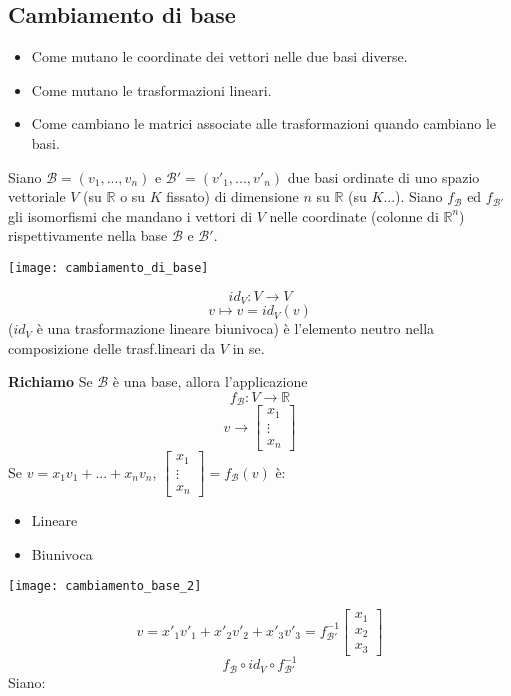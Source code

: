 \subsection{Cambiamento di base}
\begin{itemize}
    \item Come mutano le coordinate dei vettori nelle due basi diverse.
    \item Come mutano le trasformazioni lineari.
    \item Come cambiano le matrici associate alle trasformazioni quando cambiano le basi.
\end{itemize}


Siano $\mathcal{B}=(v_1,...,v_n)$ e $\mathcal{B}'=(v'_1,...,v'_n)$ due basi ordinate di uno spazio vettoriale $V$ (su $\mathbb{R}$ o su $K$ fissato) di dimensione $n$ su $\mathbb{R}$ (su $K$...).
Siano $f_{\mathcal{B}}$ ed $f_{\mathcal{B}'}$ gli isomorfismi che mandano i vettori di $V$ nelle coordinate (colonne di $\mathbb{R}^n$) rispettivamente nella base $\mathcal{B}$ e $\mathcal{B}'$.

\begin{center}
  \texttt{[image: cambiamento\_di\_base]}
\end{center}
\[id_V: V\rightarrow V\]
\[v\mapsto v=id_V(v)\]
($id_V$ è una trasformazione lineare biunivoca) è l'elemento neutro nella composizione delle trasf.lineari da $V$ in se.

\textbf{Richiamo} Se $\mathcal{B}$ è una base, allora l'applicazione
\[f_{\mathcal{B}}: V\rightarrow \mathbb{R}\]
\[v\rightarrow \begin{bmatrix}x_1\\\vdots\\x_n\end{bmatrix}\]
Se $v=x_1v_1+...+x_nv_n$, $\begin{bmatrix}x_1\\\vdots\\x_n\end{bmatrix}=f_{\mathcal{B}}(v)$ è:
\begin{itemize}
  \item Lineare
  \item Biunivoca
\end{itemize}

\begin{center}
  \texttt{[image: cambiamento\_base\_2]}
\end{center}
\[v=x'_1v'_1+x'_2v'_2+x'_3v'_3=f_{\mathcal{B}'}^{-1}\begin{bmatrix}x_1\\x_2\\x_3\end{bmatrix}\]
\[f_{\mathcal{B}}\circ id_V\circ f_{\mathcal{B}'}^{-1}\]
Siano:

